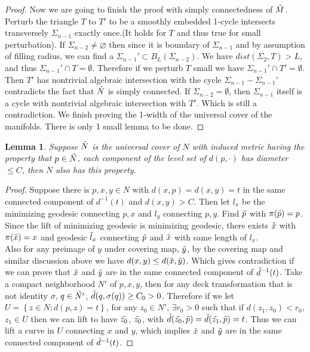 \documentclass{amsart}
\newtheorem{lemma}[theorem]{Lemma}
\theoremstyle{definition}
\theoremstyle{remark}
\numberwithin{equation}{section}
\begin{document}
\begin{proof}
Now we are going to finish the proof with simply connectedness of $\Tilde{M}$. Perturb the triangle $T$ to $T'$ to be a smoothly embedded 1-cycle intersects transversely $\Sigma_{n-1}$ exactly once.(It holds for $T$ and thus true for small perturbation). If $\Sigma_{n-2}\neq \varnothing$ then since it is boundary of $\Sigma_{n-1}$ and by assumption of filling radius, we can find a $\Sigma_{n-1}'\subset B_{L}(\Sigma_{n-2})$. We have $dist(\Sigma_{2},T)>L$, and thus $\Sigma_{n-1}'\cap T=\emptyset$. Therefore if we perturb $T$ small we have $\Sigma_{n-1}'\cap T'=\emptyset$. Then $T'$ has nontrivial algebraic intersection with the cycle $\Sigma_{n-1}-\Sigma_{n-1}'$ contradicts the fact that $\Tilde{N}$ is simply connected. If $\Sigma_{n-2}=\emptyset$, then $\Sigma_{n-1}$ itself is a cycle with nontrivial algebraic intersection with $T'$. Which is still a contradiction. We finish proving the 1-width of the universal cover of the manifolds. There is only 1 small lemma to be done.
\end{proof}

\begin{lemma}
    Suppose $\Tilde{N}$ is the universal cover of $N$ with induced metric having the property that $p\in \Tilde{N}$, each component of the level set of $d(p,\cdot)$ has diameter $\leq C$, then $N$ also has this property.
\end{lemma}
\begin{proof}
Suppose there is $p,x,y\in N$ with $d(x,p)=d(x,y)=t$ in the same connected component of $d^{-1}(t)$ and $d(x,y)>C$. Then let $l_{x}$ be the minimizing geodesic connecting $p,x$ and $l_{y}$ connecting $p,y$. Find $\Tilde{{p}}$ with $\pi(\Tilde{{p}})=p$. Since the lift of minimizing geodesic is minimizing geodesic, there exists $\Tilde{{x}}$ with $\pi(\Tilde{{x}})=x$ and geodesic $\Tilde{{l}}_{x}$ connecting $\Tilde{{p}}$ and $\Tilde{{x}}$ with same length of $l_{x}$. \\
Also for any preimage of $y$ under covering map, $\Tilde{y}$, by the covering map and similar discussion above we have $d(x,y)\leq d(\Tilde{x},\Tilde{y})$. Which gives contradiction if we can prove that $\Tilde{x}$ and $\Tilde{y}$ are in the same connected component of $\Tilde{d}^{-1}(t)$. Take a compact neighborhood $N'$ of $p,x,y$, then for any deck transformation that is not identity $\sigma$, $q\in \Tilde{N'}$, $\Tilde{d}(q,\sigma(q))\geq C_{0}>0$. Therefore if we let $U=\left\{z\in N:d(p,z)=t\right\}$, for any $z_{0}\in N'$, $\exists r_{0}>0$ such that if $d(z_{1},z_{0})<r_{0}$, $z_{1}\in U$ then we can lift to have $\Tilde{z_{0}}$, $\Tilde{z_{0}}$, with $\Tilde{d}(\Tilde{z_{0}},\Tilde{p})=\Tilde{d}(\Tilde{z_{1}},\Tilde{p})=t$. Thus we can lift a curve in $U$ connecting $x$ and $y$, which implies $\Tilde{x}$ and $\Tilde{y}$ are in the same connected component of $\Tilde{d}^{-1}(t)$. 
\end{proof}
\end{document}
